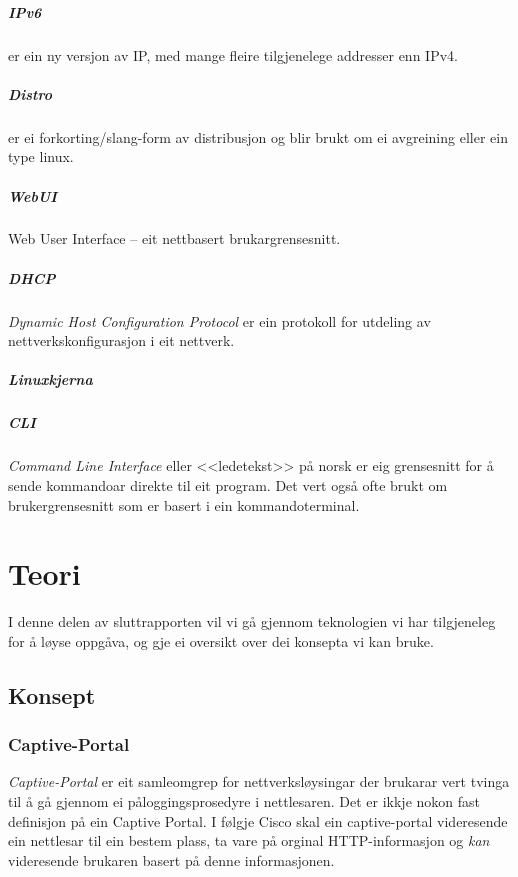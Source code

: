 \documentclass[nynorsk,12pt,a4paper,oneside]{book}
\begin{document}
\paragraph{IPv6} er ein ny versjon av IP, med mange fleire tilgjenelege addresser enn IPv4. 
\paragraph{Distro} er ei forkorting/slang-form av distribusjon og blir brukt om ei avgreining eller ein type linux.
\paragraph{WebUI} Web User Interface -- eit nettbasert brukargrensesnitt. 
\paragraph{DHCP} \emph{Dynamic Host Configuration Protocol} er ein protokoll for utdeling av nettverkskonfigurasjon i eit nettverk. 
\paragraph{Linuxkjerna} 
\paragraph{CLI} \emph{Command Line Interface} eller <<ledetekst>> på norsk er eig grensesnitt for å sende kommandoar direkte til eit program. Det vert også ofte brukt om brukergrensesnitt som er basert i ein kommandoterminal.




\chapter{Teori}
I denne delen av sluttrapporten vil vi gå gjennom teknologien vi har tilgjeneleg for å løyse oppgåva, og gje ei oversikt over dei konsepta vi kan bruke. 

\section{Konsept}
\subsection{Captive-Portal}
\emph{Captive-Portal} er eit samleomgrep for nettverksløysingar der brukarar vert tvinga til å gå gjennom ei påloggingsprosedyre i nettlesaren. Det er ikkje nokon fast definisjon på ein Captive Portal. I følgje Cisco skal ein captive-portal videresende ein nettlesar til ein bestem plass, ta vare på orginal HTTP-informasjon og \emph{kan} videresende brukaren basert på denne informasjonen. \cite{ciscoCP}
\end{document}
